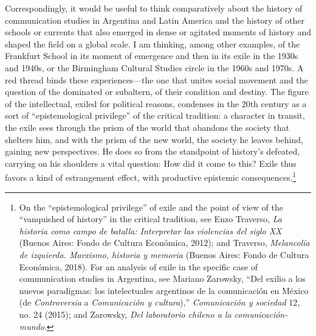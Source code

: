 \documentclass{tufte-handout}
\begin{document}
Correspondingly, it would be useful to think comparatively about the
history of communication studies in Argentina and Latin America and the
history of other schools or currents that also emerged in dense or
agitated moments of history and shaped the field on a global scale. I am
thinking, among other examples, of the Frankfurt School in its moment of
emergence and then in its exile in the 1930s and 1940s, or the
Birmingham Cultural Studies circle in the 1960s and 1970s. A red thread
binds these experiences---the one that unites social movement and the
question of the dominated or subaltern, of their condition and destiny.
The figure of the intellectual, exiled for political reasons, condenses
in the 20th century as a sort of ``epistemological privilege'' of the
critical tradition: a character in transit, the exile sees through the
prism of the world that abandons the society that shelters him, and with
the prism of the new world, the society he leaves behind, gaining new
perspectives. He does so from the standpoint of history's defeated,
carrying on his shoulders a vital question: How did it come to this?
Exile thus favors a kind of estrangement effect, with productive
epistemic consequences.\footnote{On the ``epistemological privilege'' of
  exile and the point of view of the ``vanquished of history'' in the
  critical tradition, see Enzo Traverso, \emph{La historia como campo de
  batalla: Interpretar las violencias del siglo XX} (Buenos Aires: Fondo
  de Cultura Económica, 2012); and Traverso, \emph{Melancolía de
  izquierda. Marxismo, historia y memoria} (Buenos Aires: Fondo de
  Cultura Económica, 2018). For an analysis of exile in the specific
  case of communication studies in Argentina, see Mariano Zarowsky,
  ``Del exilio a los nuevos paradigmas: los intelectuales argentinos de
  la comunicación en México (de \emph{Controversia} a \emph{Comunicación
  y cultura}),'' \emph{Comunicación y sociedad} 12\emph{,} no. 24
  (2015); and Zarowsky, \emph{Del laboratorio chileno a la
  comunicación-mundo}.}
\end{document}

